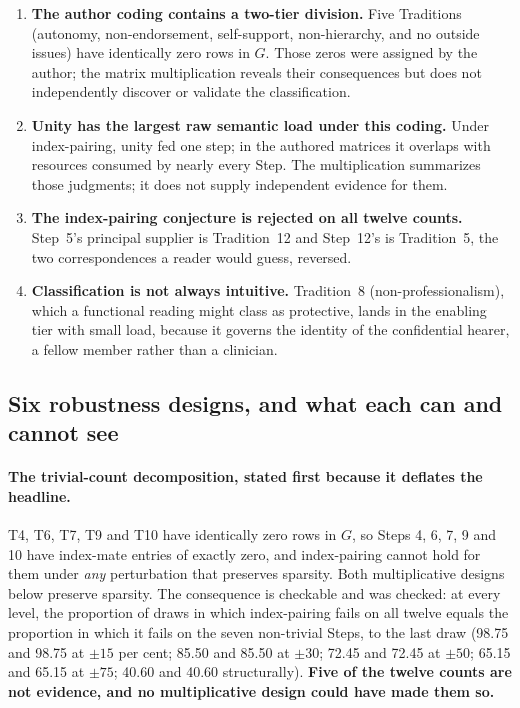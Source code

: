 \documentclass[11pt,a4paper]{article}
\begin{document}
\begin{enumerate}
\item \textbf{The author coding contains a two-tier division.} Five Traditions
(autonomy, non-endorsement, self-support, non-hierarchy, and no outside issues)
have identically zero rows in $G$. Those zeros were assigned by the author; the
matrix multiplication reveals their consequences but does not independently
discover or validate the classification.

\item \textbf{Unity has the largest raw semantic load under this coding.} Under
index-pairing, unity fed one step; in the authored matrices it overlaps with
resources consumed by nearly every Step. The multiplication summarizes those
judgments; it does not supply independent evidence for them.

\item \textbf{The index-pairing conjecture is rejected on all twelve counts.}
Step~5's principal supplier is Tradition~12 and Step~12's is Tradition~5, the two
correspondences a reader would guess, reversed.

\item \textbf{Classification is not always intuitive.} Tradition~8
(non-professionalism), which a functional reading might class as protective, lands
in the enabling tier with small load, because it governs the identity of the
confidential hearer, a fellow member rather than a clinician.
\end{enumerate}

\subsection{Six robustness designs, and what each can and cannot see}

\paragraph{The trivial-count decomposition, stated first because it deflates the
headline.} T4, T6, T7, T9 and T10 have identically zero rows in $G$, so Steps 4,
6, 7, 9 and 10 have index-mate entries of exactly zero, and index-pairing cannot
hold for them under \emph{any} perturbation that preserves sparsity. Both
multiplicative designs below preserve sparsity. The consequence is checkable and
was checked: at every level, the proportion of draws in which index-pairing fails
on all twelve equals the proportion in which it fails on the seven non-trivial
Steps, to the last draw (98.75 and 98.75 at $\pm15$ per cent; 85.50 and 85.50 at
$\pm30$; 72.45 and 72.45 at $\pm50$; 65.15 and 65.15 at $\pm75$; 40.60 and 40.60
structurally). \textbf{Five of the twelve counts are not evidence, and no
multiplicative design could have made them so.}
\end{document}
